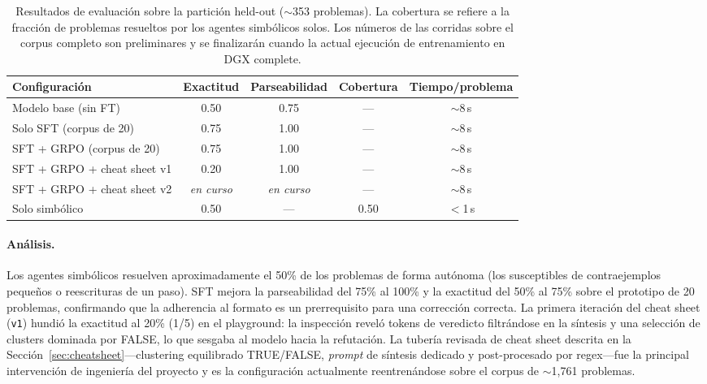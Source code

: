 \documentclass{article}
\begin{document}
\begin{table}[h]
  \caption{Resultados de evaluaci\'on sobre la partici\'on held-out ($\sim$353 problemas). La cobertura se refiere a la fracci\'on de problemas resueltos por los agentes simb\'olicos solos. Los n\'umeros de las corridas sobre el corpus completo son preliminares y se finalizar\'an cuando la actual ejecuci\'on de entrenamiento en DGX complete.}
  \label{tab:results}
  \centering
  \begin{tabular}{lcccc}
    \toprule
    Configuraci\'on & Exactitud & Parseabilidad & Cobertura & Tiempo/problema \\
    \midrule
    Modelo base (sin FT) & 0.50 & 0.75 & --- & $\sim$8\,s \\
    Solo SFT (corpus de 20) & 0.75 & 1.00 & --- & $\sim$8\,s \\
    SFT + GRPO (corpus de 20) & 0.75 & 1.00 & --- & $\sim$8\,s \\
    SFT + GRPO + cheat sheet v1 & 0.20 & 1.00 & --- & $\sim$8\,s \\
    SFT + GRPO + cheat sheet v2 & \textit{en curso} & \textit{en curso} & --- & $\sim$8\,s \\
    Solo simb\'olico & 0.50 & --- & 0.50 & $<$1\,s \\
    \bottomrule
  \end{tabular}
\end{table}

\paragraph{An\'alisis.} Los agentes simb\'olicos resuelven aproximadamente el 50\% de los problemas de forma aut\'onoma (los susceptibles de contraejemplos peque\~nos o reescrituras de un paso). SFT mejora la parseabilidad del 75\% al 100\% y la exactitud del 50\% al 75\% sobre el prototipo de 20 problemas, confirmando que la adherencia al formato es un prerrequisito para una correcci\'on correcta. La primera iteraci\'on del cheat sheet (\texttt{v1}) hundi\'o la exactitud al 20\% (1/5) en el playground: la inspecci\'on revel\'o tokens de veredicto filtr\'andose en la s\'intesis y una selecci\'on de clusters dominada por FALSE, lo que sesgaba al modelo hacia la refutaci\'on. La tuber\'ia revisada de cheat sheet descrita en la Secci\'on~\ref{sec:cheatsheet}---clustering equilibrado TRUE/FALSE, \textit{prompt} de s\'intesis dedicado y post-procesado por regex---fue la principal intervenci\'on de ingenier\'ia del proyecto y es la configuraci\'on actualmente reentren\'andose sobre el corpus de $\sim$1{,}761 problemas.
\end{document}
